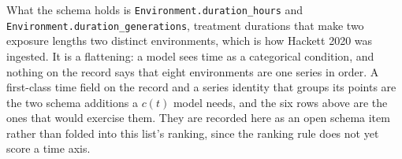 What the schema holds is \texttt{Environment.duration\_hours} and
\texttt{Environment.duration\_generations}, treatment durations that make two exposure
lengths two distinct environments, which is how Hackett 2020 was ingested. It is a
flattening: a model sees time as a categorical condition, and nothing on the record says
that eight environments are one series in order. A first-class time field on the record
and a series identity that groups its points are the two schema additions a $c(t)$ model
needs, and the six rows above are the ones that would exercise them. They are recorded
here as an open schema item rather than folded into this list's ranking, since the ranking
rule does not yet score a time axis.

